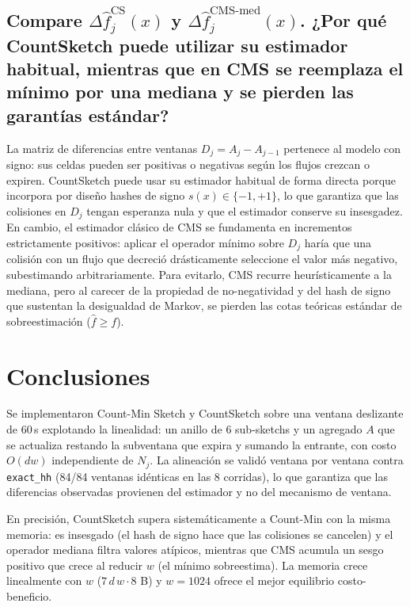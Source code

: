 \documentclass[10pt,a4paper]{article}
\begin{document}
\subsection{
Compare $\Delta \widehat{f}_j^{\text{CS}}(x)$ y $\Delta \widehat{f}_j^{\text{CMS-med}}(x)$. ¿Por qué CountSketch puede utilizar su estimador habitual, mientras que en CMS se reemplaza el mínimo por una mediana y se pierden las garantías estándar?}

La matriz de diferencias entre ventanas $D_j = A_j - A_{j-1}$ pertenece al modelo con signo: sus celdas pueden ser positivas o negativas según los flujos crezcan o expiren. CountSketch puede usar su estimador habitual de forma directa porque incorpora por diseño hashes de signo $s(x) \in \{-1, +1\}$, lo que garantiza que las colisiones en $D_j$ tengan esperanza nula y que el estimador conserve su insesgadez. En cambio, el estimador clásico de CMS se fundamenta en incrementos estrictamente positivos: aplicar el operador mínimo sobre $D_j$ haría que una colisión con un flujo que decreció drásticamente seleccione el valor más negativo, subestimando arbitrariamente. Para evitarlo, CMS recurre heurísticamente a la mediana, pero al carecer de la propiedad de no-negatividad y del hash de signo que sustentan la desigualdad de Markov, se pierden las cotas teóricas estándar de sobreestimación ($\hat f \ge f$).

\section{Conclusiones}

Se implementaron Count-Min Sketch y CountSketch sobre una ventana deslizante de 60\,s explotando la linealidad: un anillo de 6 sub-sketchs y un agregado $A$ que se actualiza restando la subventana que expira y sumando la entrante, con costo $O(dw)$ independiente de $N_j$. La alineación se validó ventana por ventana contra \texttt{exact\_hh} (84/84 ventanas idénticas en las 8 corridas), lo que garantiza que las diferencias observadas provienen del estimador y no del mecanismo de ventana.

En precisión, CountSketch supera sistemáticamente a Count-Min con la misma memoria: es insesgado (el hash de signo hace que las colisiones se cancelen) y el operador mediana filtra valores atípicos, mientras que CMS acumula un sesgo positivo que crece al reducir $w$ (el mínimo sobreestima). La memoria crece linealmente con $w$ ($7\,d\,w\cdot 8$ B) y $w=1024$ ofrece el mejor equilibrio costo-beneficio.
\end{document}
